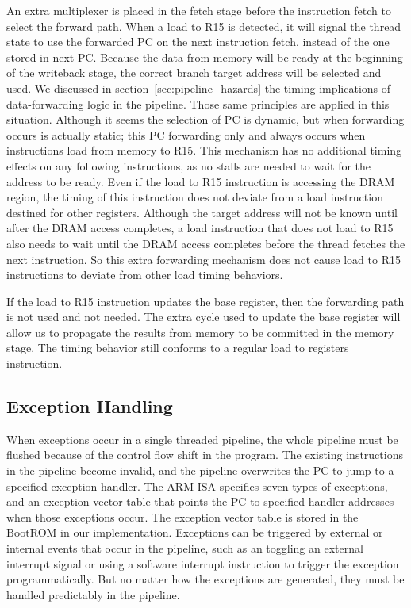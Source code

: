 An extra multiplexer is placed in the fetch stage before the instruction fetch to select the forward path.
When a load to R15 is detected, it will signal the thread state to use the forwarded PC on the next instruction fetch, instead of the one stored in next PC.
Because the data from memory will be ready at the beginning of the writeback stage, the correct branch target address will be selected and used.
We discussed in section~\ref{sec:pipeline_hazards} the timing implications of data-forwarding logic in the pipeline.
Those same principles are applied in this situation.
Although it seems the selection of PC is dynamic, but when forwarding occurs is actually static; this PC forwarding only and always occurs when instructions load from memory to R15.
This mechanism has no additional timing effects on any following instructions, as no stalls are needed to wait for the address to be ready. 
Even if the load to R15 instruction is accessing the DRAM region, the timing of this instruction does not deviate from a load instruction destined for other registers.
Although the target address will not be known until after the DRAM access completes, a load instruction that does not load to R15 also needs to wait until the DRAM access completes before the thread fetches the next instruction. 
So this extra forwarding mechanism does not cause load to R15 instructions to deviate from other load timing behaviors.

If the load to R15 instruction updates the base register, then the forwarding path is not used and not needed. 
The extra cycle used to update the base register will allow us to propagate the results from memory to be committed in the memory stage.
The timing behavior still conforms to a regular load to registers instruction. 

\subsection{Exception Handling}
\label{subsec:exception_handling_in_ptarm}
When exceptions occur in a single threaded pipeline, the whole pipeline must be flushed because of the control flow shift in the program. 
The existing instructions in the pipeline become invalid, and the pipeline overwrites the PC to jump to a specified exception handler. 
The ARM ISA specifies seven types of exceptions, and an exception vector table that points the PC to specified handler addresses when those exceptions occur. 
The exception vector table is stored in the BootROM in our implementation.
Exceptions can be triggered by external or internal events that occur in the pipeline, such as an toggling an external interrupt signal or using a software interrupt instruction to trigger the exception programmatically.
But no matter how the exceptions are generated, they must be handled predictably in the pipeline.
 
